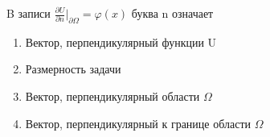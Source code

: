 B записи \(\frac{\partial U}{\partial n}\vert _{ \partial \Omega }=\varphi (x)\) буква n означает

\begin{enumerate}[label=\arabic*)]
    \item Вектор, перпендикулярный функции U
    \item Размерность задачи
    \item Вектор, перпендикулярный области \(\Omega\)
    \item Вектор, перпендикулярный к границе области \(\Omega\)
\end{enumerate}

